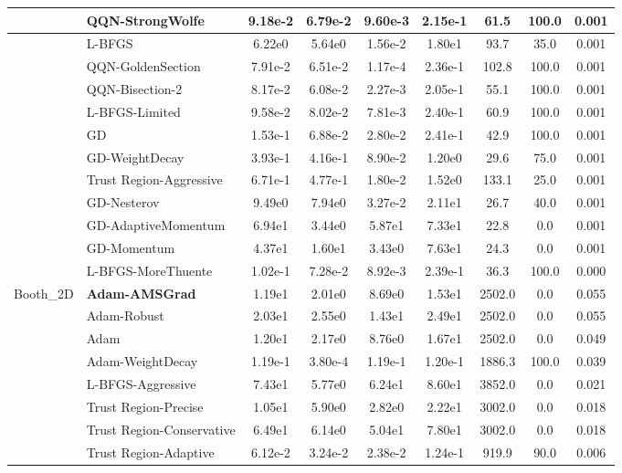 \documentclass{article}
\begin{document}
\begin{longtable}{|l|l|c|c|c|c|c|c|c|}
\hline
 & QQN-StrongWolfe & 9.18e-2 & 6.79e-2 & 9.60e-3 & 2.15e-1 & 61.5 & 100.0 & 0.001 \\
\hline
 & L-BFGS & 6.22e0 & 5.64e0 & 1.56e-2 & 1.80e1 & 93.7 & 35.0 & 0.001 \\
\hline
 & QQN-GoldenSection & 7.91e-2 & 6.51e-2 & 1.17e-4 & 2.36e-1 & 102.8 & 100.0 & 0.001 \\
\hline
 & QQN-Bisection-2 & 8.17e-2 & 6.08e-2 & 2.27e-3 & 2.05e-1 & 55.1 & 100.0 & 0.001 \\
\hline
 & L-BFGS-Limited & 9.58e-2 & 8.02e-2 & 7.81e-3 & 2.40e-1 & 60.9 & 100.0 & 0.001 \\
\hline
 & GD & 1.53e-1 & 6.88e-2 & 2.80e-2 & 2.41e-1 & 42.9 & 100.0 & 0.001 \\
\hline
 & GD-WeightDecay & 3.93e-1 & 4.16e-1 & 8.90e-2 & 1.20e0 & 29.6 & 75.0 & 0.001 \\
\hline
 & Trust Region-Aggressive & 6.71e-1 & 4.77e-1 & 1.80e-2 & 1.52e0 & 133.1 & 25.0 & 0.001 \\
\hline
 & GD-Nesterov & 9.49e0 & 7.94e0 & 3.27e-2 & 2.11e1 & 26.7 & 40.0 & 0.001 \\
\hline
 & GD-AdaptiveMomentum & 6.94e1 & 3.44e0 & 5.87e1 & 7.33e1 & 22.8 & 0.0 & 0.001 \\
\hline
 & GD-Momentum & 4.37e1 & 1.60e1 & 3.43e0 & 7.63e1 & 24.3 & 0.0 & 0.001 \\
\hline
 & L-BFGS-MoreThuente & 1.02e-1 & 7.28e-2 & 8.92e-3 & 2.39e-1 & 36.3 & 100.0 & 0.000 \\
Booth\_2D & \textbf{Adam-AMSGrad} & 1.19e1 & 2.01e0 & 8.69e0 & 1.53e1 & 2502.0 & 0.0 & 0.055 \\
\hline
 & Adam-Robust & 2.03e1 & 2.55e0 & 1.43e1 & 2.49e1 & 2502.0 & 0.0 & 0.055 \\
\hline
 & Adam & 1.20e1 & 2.17e0 & 8.76e0 & 1.67e1 & 2502.0 & 0.0 & 0.049 \\
\hline
 & Adam-WeightDecay & 1.19e-1 & 3.80e-4 & 1.19e-1 & 1.20e-1 & 1886.3 & 100.0 & 0.039 \\
\hline
 & L-BFGS-Aggressive & 7.43e1 & 5.77e0 & 6.24e1 & 8.60e1 & 3852.0 & 0.0 & 0.021 \\
\hline
 & Trust Region-Precise & 1.05e1 & 5.90e0 & 2.82e0 & 2.22e1 & 3002.0 & 0.0 & 0.018 \\
\hline
 & Trust Region-Conservative & 6.49e1 & 6.14e0 & 5.04e1 & 7.80e1 & 3002.0 & 0.0 & 0.018 \\
\hline
 & Trust Region-Adaptive & 6.12e-2 & 3.24e-2 & 2.38e-2 & 1.24e-1 & 919.9 & 90.0 & 0.006 \\
\hline

\end{longtable}
\end{document}
